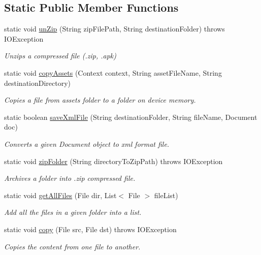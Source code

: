 \subsection*{Static Public Member Functions}
\begin{DoxyCompactItemize}
\item 
static void \hyperlink{classorg_1_1buildmlearn_1_1toolkit_1_1utilities_1_1FileUtils_a3985505c7367639777e7829b87fa625b}{un\-Zip} (String zip\-File\-Path, String destination\-Folder)  throws I\-O\-Exception 
\begin{DoxyCompactList}\small\item\em Unzips a compressed file (.zip, .apk) \end{DoxyCompactList}\item 
static void \hyperlink{classorg_1_1buildmlearn_1_1toolkit_1_1utilities_1_1FileUtils_a40211ea6f81fcdd275cb33047c67c01a}{copy\-Assets} (Context context, String asset\-File\-Name, String destination\-Directory)
\begin{DoxyCompactList}\small\item\em Copies a file from assets folder to a folder on device memory. \end{DoxyCompactList}\item 
static boolean \hyperlink{classorg_1_1buildmlearn_1_1toolkit_1_1utilities_1_1FileUtils_a37f577c0b56f2ffc56824657ac220fb7}{save\-Xml\-File} (String destination\-Folder, String file\-Name, Document doc)
\begin{DoxyCompactList}\small\item\em Converts a given Document object to xml format file. \end{DoxyCompactList}\item 
static void \hyperlink{classorg_1_1buildmlearn_1_1toolkit_1_1utilities_1_1FileUtils_aa79713cc1d17fbf9b7294c60e851b774}{zip\-Folder} (String directory\-To\-Zip\-Path)  throws I\-O\-Exception 
\begin{DoxyCompactList}\small\item\em Archives a folder into .zip compressed file. \end{DoxyCompactList}\item 
static void \hyperlink{classorg_1_1buildmlearn_1_1toolkit_1_1utilities_1_1FileUtils_aa61e000a3890f6d8b42c1a537f8c2df4}{get\-All\-Files} (File dir, List$<$ File $>$ file\-List)
\begin{DoxyCompactList}\small\item\em Add all the files in a given folder into a list. \end{DoxyCompactList}\item 
static void \hyperlink{classorg_1_1buildmlearn_1_1toolkit_1_1utilities_1_1FileUtils_a22131f5eeefec02f52908ab439ab528b}{copy} (File src, File dst)  throws I\-O\-Exception 
\begin{DoxyCompactList}\small\item\em Copies the content from one file to another. \end{DoxyCompactList}\end{DoxyCompactItemize}


